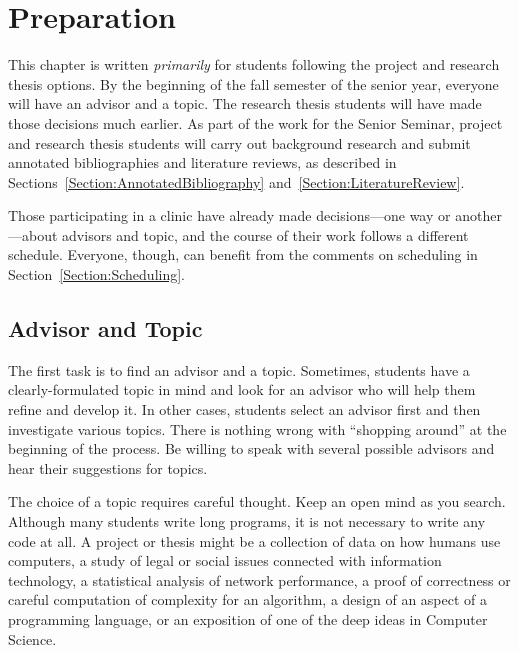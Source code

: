 \documentclass[finalcopy]{srpaper}
\def\hyperref[#1]{}
\let\plainref\ref
\newcommand{\plainref}{\ref*}
\newcommand{\namedref}[2]{\hyperref[#2]{#1~\plainref{#2}}}
\begin{document}
%
%
\chapter{Preparation}
\label{Chapter:Preparation}
This chapter is written \emph{primarily} for students
following the project and research thesis options. By the
beginning of the fall semester of the senior year, everyone
will have an advisor and a
topic. The research thesis
students will have made those decisions much earlier. As
part of the work for the Senior Seminar, project and
research thesis students will carry out background research
and submit annotated bibliographies and literature reviews,
as described in
\namedref{Sections}{Section:AnnotatedBibliography}
and~\ref{Section:LiteratureReview}.

Those participating in a clinic have already made
decisions---one way or another---about advisors and topic,
and the course of their work follows a different
schedule. Everyone, though, can benefit from the comments on
scheduling in \namedref{Section}{Section:Scheduling}.


\section{Advisor and Topic}
\label{Section:AdvisorAndTopic}
The first task is to find an advisor and a topic. Sometimes,
students have a clearly-formulated topic in mind and look
for an advisor who will help them refine and develop it. In
other cases, students select an advisor first and then
investigate various topics. There is nothing wrong with
``shopping around'' at the beginning of the process. Be
willing to speak with several possible advisors and hear
their suggestions for topics.

The choice of a topic requires careful thought. Keep an open
mind as you search.  Although many students write long
programs, it is not necessary to write any code at all. A
project or thesis might be a collection of data on how
humans use computers, a study of legal or social issues
connected with information technology, a statistical
analysis of network performance, a proof of correctness or
careful computation of complexity for an algorithm, a design
of an aspect of a programming language, or an exposition of
one of the deep ideas in Computer Science.
\end{document}
